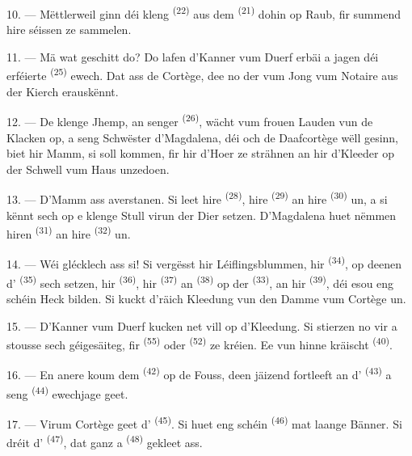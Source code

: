 10. --- Mëttlerweil ginn déi kleng  \textsuperscript{(22)} aus dem
 \textsuperscript{(21)} dohin op Raub, fir summend hire séissen
 ze sammelen.

11. --- Mä wat geschitt do? Do lafen d'Kanner vum Duerf erbäi a jagen déi erféierte
 \textsuperscript{(25)} ewech. Dat ass de Cortège, dee no der
 vum Jong vum Notaire aus der Kierch erauskënnt.

12. --- De klenge Jhemp, an senger  \textsuperscript{(26)}, wächt vum
frouen Lauden vun de Klacken op, a seng Schwëster d'Magdalena, déi och de
Daafcortège wëll gesinn, biet hir Mamm, si soll kommen, fir hir d'Hoer ze strähnen
an hir d'Kleeder op der Schwell vum Haus unzedoen.

13. --- D'Mamm ass averstanen. Si leet hire  \textsuperscript{(28)},
hire  \textsuperscript{(29)} an hire 
\textsuperscript{(30)} un, a si kënnt sech op e klenge Stull virun der Dier setzen.
D'Magdalena huet nëmmen hiren  \textsuperscript{(31)} an hire
 \textsuperscript{(32)} un.

14. --- Wéi glécklech ass si! Si vergësst hir Léiflingsblummen, hir
 \textsuperscript{(34)}, op deenen d'
\textsuperscript{(35)} sech setzen, hir  \textsuperscript{(36)}, hir
 \textsuperscript{(37)} an  \textsuperscript{(38)}
op der  \textsuperscript{(33)}, an hir 
\textsuperscript{(39)}, déi esou eng schéin Heck bilden. Si kuckt d'räich Kleedung
vun den Damme vum Cortège un.

15. --- D'Kanner vum Duerf kucken net vill op d'Kleedung. Si stierzen no vir a
stousse sech géigesäiteg, fir  \textsuperscript{(55)} oder
 \textsuperscript{(52)} ze kréien. Ee vun hinne kräischt
\textsuperscript{(40)}.

16. --- En anere koum dem  \textsuperscript{(42)} op de Fouss, deen
jäizend fortleeft an d' \textsuperscript{(43)} a seng
 \textsuperscript{(44)} ewechjage geet.

\VUsaut{5.0mm}
\VUsaut{4.0mm}

17. --- Virum Cortège geet d' \textsuperscript{(45)}. Si huet eng
schéin  \textsuperscript{(46)} mat laange Bänner. Si dréit
d' \textsuperscript{(47)}, dat ganz a 
\textsuperscript{(48)} gekleet ass.

